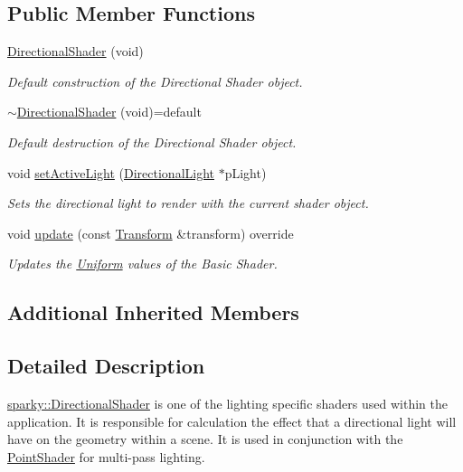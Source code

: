 \subsection*{Public Member Functions}
\begin{DoxyCompactItemize}
\item 
\hyperlink{classsparky_1_1_directional_shader_a98b1b8c2a88f86c67f1049fdb3b1d17b}{Directional\+Shader} (void)
\begin{DoxyCompactList}\small\item\em Default construction of the Directional Shader object. \end{DoxyCompactList}\item 
\hyperlink{classsparky_1_1_directional_shader_a6cb1980162a5d1cee65b3a3a6b0edf43}{$\sim$\+Directional\+Shader} (void)=default\hypertarget{classsparky_1_1_directional_shader_a6cb1980162a5d1cee65b3a3a6b0edf43}{}\label{classsparky_1_1_directional_shader_a6cb1980162a5d1cee65b3a3a6b0edf43}

\begin{DoxyCompactList}\small\item\em Default destruction of the Directional Shader object. \end{DoxyCompactList}\item 
void \hyperlink{classsparky_1_1_directional_shader_a3291e55f453b936a84499769c853cddb}{set\+Active\+Light} (\hyperlink{classsparky_1_1_directional_light}{Directional\+Light} $\ast$p\+Light)
\begin{DoxyCompactList}\small\item\em Sets the directional light to render with the current shader object. \end{DoxyCompactList}\item 
void \hyperlink{classsparky_1_1_directional_shader_ab2776568ee2f03af47daa97ae138d7a0}{update} (const \hyperlink{classsparky_1_1_transform}{Transform} \&transform) override
\begin{DoxyCompactList}\small\item\em Updates the \hyperlink{classsparky_1_1_uniform}{Uniform} values of the Basic Shader. \end{DoxyCompactList}\end{DoxyCompactItemize}
\subsection*{Additional Inherited Members}


\subsection{Detailed Description}
\hyperlink{classsparky_1_1_directional_shader}{sparky\+::\+Directional\+Shader} is one of the lighting specific shaders used within the application. It is responsible for calculation the effect that a directional light will have on the geometry within a scene. It is used in conjunction with the \hyperlink{classsparky_1_1_point_shader}{Point\+Shader} for multi-\/pass lighting.

